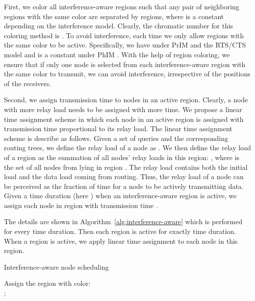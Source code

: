 \documentclass[conference,10pt]{IEEEtran}\usepackage{amsmath}
\begin{document}
First, we color all interference-aware regions
 such that any pair of neighboring regions with the same
 color are separated by  regions, where  is a constant
 depending on the interference model.
Clearly, the chromatic number for this coloring method is .
To avoid interference, each time we only allow regions with the same
 color to be active.
Specifically, we have  under
  PrIM and the RTS/CTS model and  is a constant under PhIM \cite{xu2012TMC}.
With the help of region coloring, we ensure that if
 only one node is selected from each interference-aware region with
 the same color to transmit, we can avoid interference, irrespective of the positions of
 the receivers.

Second, we assign transmission time to nodes in an active region.
Clearly, a node with more relay load needs to be assigned with more
time. We propose a {linear time assignment} scheme in which each
node in an active
 region is assigned with transmission time proportional to its relay load.
 The linear time assignment scheme is describe as follows.
Given a set of queries  and the corresponding routing trees, we define the {relay load} of a node 
as .
We then define the relay load of a region  as
 the summation of
 all nodes' relay loads in this region:  , where  is the set of all nodes from  lying
 in region .
The relay load contains both the initial load and the data load
coming from routing.
Thus, the relay load of a node can be perceived
 as the fraction of time for a node
 to be actively transmitting data.
Given a time duration  (here ) when
an interference-aware region  is active,
 we  assign each node  in region  with transmission time .

The details are shown in Algorithm~\ref{alg:interference-aware}
which is performed for every  time duration.
Then each region is active for exactly  time duration. When a
region is active, we apply linear time assignment to each node in
this region.

{\small
\begin{algorithm}[t]
\label{alg:interference-aware} \LinesNumbered
\caption{Interference-aware node scheduling}

{ \;

 {
 Assign the region with color:\\
 ;}

  }
\end{algorithm}
}
\end{document}
